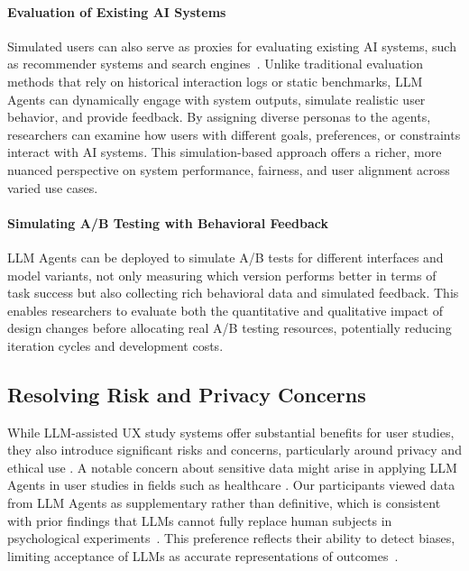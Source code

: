 \documentclass[manuscript,review,anonymous]{acmart}
\DeclareRobustCommand{\note}[1]{{\sethlcolor{orange!30!white}\hl{#1}}}
\begin{document}
\paragraph{Evaluation of Existing AI Systems}

Simulated users can also serve as proxies for evaluating existing AI systems, such as recommender systems and search engines~\cite{ma2025pub, zhao2025exploring}. Unlike traditional evaluation methods that rely on historical interaction logs or static benchmarks, LLM Agents can dynamically engage with system outputs, simulate realistic user behavior, and provide feedback. By assigning diverse personas to the agents, researchers can examine how users with different goals, preferences, or constraints interact with AI systems. This simulation-based approach offers a richer, more nuanced perspective on system performance, fairness, and user alignment across varied use cases.

\paragraph{Simulating A/B Testing with Behavioral Feedback}
LLM Agents can be deployed to simulate A/B tests for different interfaces and model variants, not only measuring which version performs better in terms of task success but also collecting rich behavioral data and simulated feedback.
This enables researchers to evaluate both the quantitative and qualitative impact of design changes before allocating real A/B testing resources, potentially reducing iteration cycles and development costs.

\subsection{Resolving Risk and Privacy Concerns}

While LLM-assisted UX study systems offer substantial benefits for user studies, they also introduce significant risks and concerns, particularly around privacy and ethical use \cite{liHumanCenteredPrivacyResearch2024, shaoPrivacyLensEvaluatingPrivacy2024}. 
A notable concern about sensitive data might arise in applying LLM Agents in user studies in fields such as healthcare \cite{perisPrivacyTimeLanguage2023}.
Our participants viewed data from LLM Agents as supplementary rather than definitive, which is consistent with prior findings that LLMs cannot fully replace human subjects in psychological experiments~\cite{cui2024can}. 
This preference reflects their ability to detect biases, limiting acceptance of LLMs as accurate representations of outcomes~\cite{schmidtSimulatingHumanHCD2024}.
\end{document}
